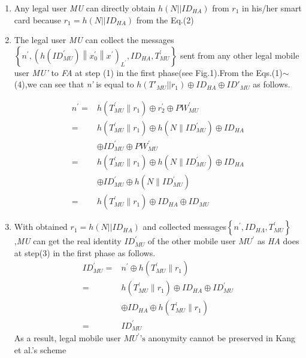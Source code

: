 \documentclass{article}
\begin{document}
\begin{enumerate}
    \item Any legal user \emph{MU} can directly obtain $h(N||{ID}_{HA})$ from $r_1$ in his/her smart card 
    because $r_1=h(N||{ID}_{HA})$ from the Eq.(2)
    \item The legal user \emph{MU} can collect the messages $\left\{n^{\prime},\left(h\left(I D_{M U}^{\prime}\right)\left\|x_{0}^{\prime}\right\| x^{\prime}\right)_{L^{\prime}}, I D_{H A}, T_{M U}^{\prime}\right\}$ sent from any other legal mobile user 
    \emph{MU'} to \emph{FA} at step (1) in the first phase(see Fig.1).From the Eqs.(1)$\sim$(4),we can see that 
    \emph{n'} is equal to $h({T'}_{MU} ||r_1)\oplus {ID}_{HA}\oplus {ID'}_{MU}$ as follows.


\begin{equation}
    \begin{aligned}
        n^{\prime}=& h\left(T_{M U}^{\prime} \| r_{1}\right) \oplus r_{2}^{\prime} \oplus P W_{M U}^{\prime} \\
        =& h\left(T_{M U}^{\prime} \| r_{1}\right) \oplus h\left(N \| I D_{M U}^{\prime}\right) \oplus I D_{H A} \\
        & \oplus I D_{M U}^{\prime} \oplus P W_{M U}^{\prime} \\
        =& h\left(T_{M U}^{\prime} \| r_{1}\right) \oplus h\left(N \| I D_{M U}^{\prime}\right) \oplus I D_{H A} \\
        & \oplus I D_{M U}^{\prime} \oplus h\left(N \| I D_{M U}^{\prime}\right) \\
        =& h\left(T_{M U}^{\prime} \| r_{1}\right) \oplus I D_{H A} \oplus I D_{M U}
        \end{aligned}
\end{equation}
    \item With obtained $r_1=h(N||{ID}_{HA})$ and collected messages$\left\{n^{\prime}, I D_{H \Lambda}, T_{M U}^{\prime}\right\}$,\emph{MU} can get the real identity ${ID}^{\prime}_{MU}$ of the other mobile user $MU^{\prime}$ as \emph{HA} does at step(3) in 
the first phase as follows. 
\begin{equation}
    \begin{aligned}
        I D_{M U}^{\prime}=& n^{\prime} \oplus h\left(T_{M U}^{\prime} \| r_{1}\right) \\
        =& h\left(T_{M U}^{\prime} \| r_{1}\right) \oplus I D_{H A} \oplus I D_{M U}^{\prime} \\
        & \oplus I D_{H A} \oplus h\left(T_{M U}^{\prime} \| r_{1}\right) \\
        =& I D_{M U}^{\prime}
        \end{aligned}
\end{equation}
As a result, legal mobile user $MU^{\prime}\text{'s}$ anonymity cannot be preserved in Kang et al.’s scheme
\end{enumerate}
\end{document}
